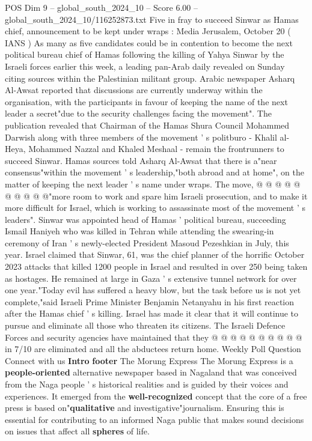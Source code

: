\begin{textsample}{POS Dim 9 – global\_south\_2024\_10 – Score 6.00 – global\_south\_2024\_10/116252873.txt}  \label{ex:f9_pos_086}
Five in fray to succeed Sinwar as Hamas chief, announcement to be kept under wraps : Media Jerusalem, October 20 ( IANS ) As many as five candidates could be in contention to become the next political bureau chief of Hamas following the killing of Yahya Sinwar by the Israeli forces earlier this week, a leading pan-Arab daily revealed on Sunday citing sources within the Palestinian militant group.
Arabic newspaper Asharq Al-Awsat reported that discussions are currently underway within the organisation, with the participants in favour of keeping the name of the next leader a secret"due to the security challenges facing the movement".
The publication revealed that Chairman of the Hamas Shura Council Mohammed Darwish along with three members of the movement ' s politburo - Khalil al-Heya, Mohammed Nazzal and Khaled Meshaal - remain the frontrunners to succeed Sinwar.
Hamas sources told Asharq Al-Awsat that there is a"near consensus"within the movement ' s leadership,"both abroad and at home", on the matter of keeping the next leader ' s name under wraps.
The move, @ @ @ @ @ @ @ @ @ @"more room to work and spare him Israeli prosecution, and to make it more difficult for Israel, which is working to assassinate most of the movement ' s leaders".
Sinwar was appointed head of Hamas ' political bureau, succeeding Ismail Haniyeh who was killed in Tehran while attending the swearing-in ceremony of Iran ' s newly-elected President Masoud Pezeshkian in July, this year.
Israel claimed that Sinwar, 61, was the chief planner of the horrific October 2023 attacks that killed 1200 people in Israel and resulted in over 250 being taken as hostages.
He remained at large in Gaza ' s extensive tunnel network for over one year."Today evil has suffered a heavy blow, but the task before us is not yet complete,"said Israeli Prime Minister Benjamin Netanyahu in his first reaction after the Hamas chief ' s killing.
Israel has made it clear that it will continue to pursue and eliminate all those who threaten its citizens.
The Israeli Defence Forces and security agencies have maintained that they @ @ @ @ @ @ @ @ @ @ in 7/10 are eliminated and all the abductees return home.
Weekly Poll Question Connect with us \textbf{Intro} \textbf{footer} The Morung Express The Morung Express is a \textbf{people-oriented} alternative newspaper based in Nagaland that was conceived from the Naga people ' s historical realities and is guided by their voices and experiences.
It emerged from the \textbf{well-recognized} concept that the core of a free press is based on"\textbf{qualitative} and investigative"journalism.
Ensuring this is essential for contributing to an informed Naga public that makes sound decisions on issues that affect all \textbf{spheres} of life.

\end{textsample}
